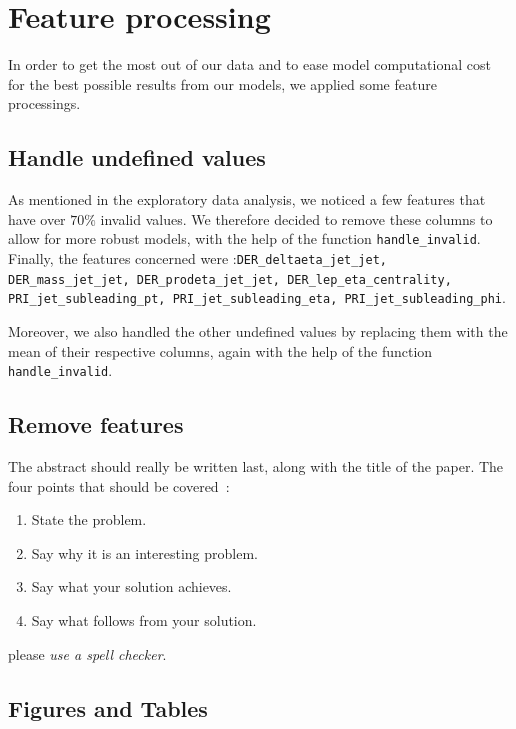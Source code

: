 \documentclass[10pt,conference,compsocconf]{IEEEtran}
\begin{document}
\section{Feature processing}
In order to get the most out of our data and to ease model computational cost for the best possible results from our models, we applied some feature processings.

\subsection{Handle undefined values}
As mentioned in the exploratory data analysis, we noticed a few features that have over $70\%$ invalid values. We therefore decided to remove these columns to allow for more robust models, with the help of the function \texttt{handle\_invalid}. Finally, the features concerned were :\texttt{DER\_deltaeta\_jet\_jet, DER\_mass\_jet\_jet, DER\_prodeta\_jet\_jet, DER\_lep\_eta\_centrality, PRI\_jet\_subleading\_pt, PRI\_jet\_subleading\_eta, PRI\_jet\_subleading\_phi}.

Moreover, we also handled the other undefined values by replacing them with the mean of their respective columns, again with the help of the function \texttt{handle\_invalid}.

\subsection{Remove features}
The abstract should really be written last, along with the title of
the paper. The four points that should be covered~\cite{jones08}:
\begin{enumerate}
\item State the problem.
\item Say why it is an interesting problem.
\item Say what your solution achieves.
\item Say what follows from your solution.
\end{enumerate}

please \emph{use a
  spell checker}.

\subsection{Figures and Tables}
\end{document}
